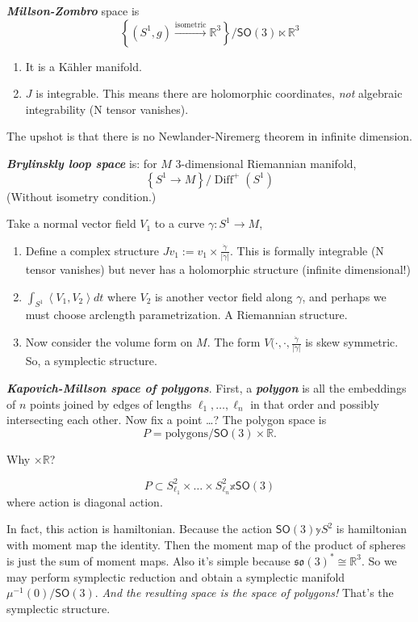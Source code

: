 \begin{defn}\leavevmode
	\textit{\textbf{Millson-Zombro}} space is
	\[\left\{ (S^1,g)\xrightarrow{\text{isometric} }\mathbb{R}^3 \right\}\Big/\mathsf{SO}(3)\ltimes \mathbb{R}^3 \]	
\end{defn}
\begin{enumerate}
\item It is a Kähler manifold.
\item $J$ is integrable. This means there are holomorphic coordinates, \textit{not} algebraic integrability (N tensor vanishes). 
\end{enumerate}
The upshot is that there is no Newlander-Niremerg theorem in infinite dimension.
\begin{defn}\leavevmode
	\textit{\textbf{Brylinskly loop space}} is: for $M$ 3-dimensional Riemannian manifold,
	\[\left\{ S^1\to M \right\} \Big/\operatorname{Diff}^+(S^1)\]
	(Without isometry condition.)
\end{defn}
Take a normal vector field $V_1$ to a curve $\gamma:S^1\to M$,
\begin{enumerate}
\item Define a complex structure $J v_1:=v_1 \times \frac{\dot \gamma}{|\dot \gamma|}$. This is formally integrable (N tensor vanishes) but never has a holomorphic structure (infinite dimensional!)
\item $\int_{S^1}\left<V_1,V_2\right>dt$ where $V_2$ is another vector field along $\gamma$, and perhaps we must choose arclength parametrization. A Riemannian structure.
\item Now consider the volume form on $M$. The form $V(\cdot,\cdot,\frac{\dot\gamma}{|\dot\gamma|}$ is skew symmetric. So, a symplectic structure.
\end{enumerate}

\begin{defn}\leavevmode
	\textit{\textbf{Kapovich-Millson space of polygons}}. First, a \textit{\textbf{polygon}} is all the embeddings of $n$ points joined by edges of lengths  $\ell_1,\ldots,\ell_n$ in that order and possibly intersecting each other. Now fix a point …? The polygon space is
	\[P=\text{polygons}\Big/\mathsf{SO}(3)\times \mathbb{R} .\]
\begin{question}\leavevmode
	Why $\times\mathbb{R}$?
\end{question}	
	\[P\subset S^2_{\ell_1}\times\ldots\times S^2_{\ell_n}\mathbb{x} \mathsf{SO}(3)\]
	where action is diagonal action.
\end{defn}
In fact, this action is hamiltonian. Because the action $\mathsf{SO}(3)\mathbb{y}S^2$ is hamiltonian with moment map the identity. Then the moment map of the product of spheres is just the sum of moment maps. Also it's simple because $\mathfrak{so}(3)^*\cong \mathbb{R}^3$. So we may perform symplectic reduction and obtain a symplectic manifold $\mu^{-1}(0)/\mathsf{SO}(3)$. \textit{And the resulting space is the space of polygons!} That's the symplectic structure. 


